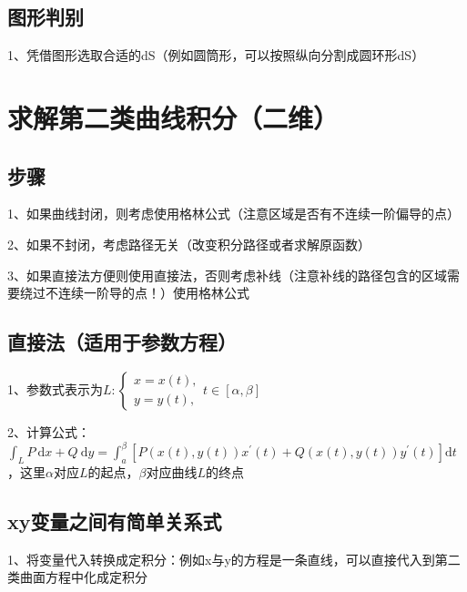 \subsection{图形判别}

1、凭借图形选取合适的dS（例如圆筒形，可以按照纵向分割成圆环形dS）

\section{求解第二类曲线积分（二维）}



\subsection{步骤}

1、如果曲线封闭，则考虑使用格林公式（注意区域是否有不连续一阶偏导的点）

2、如果不封闭，考虑路径无关（改变积分路径或者求解原函数）

3、如果直接法方便则使用直接法，否则考虑补线（注意补线的路径包含的区域需要绕过不连续一阶导的点！）使用格林公式



\subsection{直接法（适用于参数方程）}

1、参数式表示为$L:\left\{\begin{array}{l}x=x(t), \\ y=y(t),\end{array} t \in[\alpha, \beta]\right.$

2、计算公式：$\int_{L} P \mathrm{~d} x+Q \mathrm{~d} y=\int_{a}^{\beta}\left[P(x(t), y(t)) x^{\prime}(t)+Q(x(t), y(t)) y^{\prime}(t)\right] \mathrm{d} t$，这里$\alpha$对应$L$的起点，$\beta$对应曲线$L$的终点



\subsection{xy变量之间有简单关系式}

1、将变量代入转换成定积分：例如x与y的方程是一条直线，可以直接代入到第二类曲面方程中化成定积分


